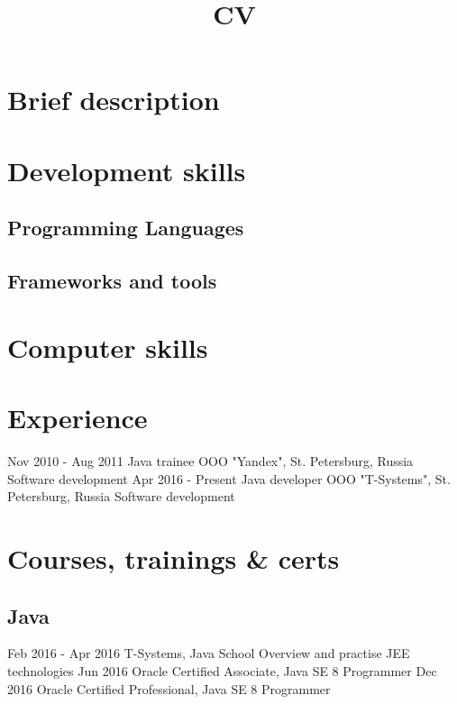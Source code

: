 \documentclass[11pt,a4paper,russian]{moderncv}
\title{CV}
\begin{document}
\maketitle

\section{Brief description}
  
\section{Development skills}

\subsection{Programming Languages}

\subsection{Frameworks and tools}

\section{Computer skills}
  
\section{Experience}
\cventry
    {Nov 2010 - Aug 2011}
    {Java trainee}
    {OOO "Yandex", St. Petersburg, Russia}{}{}
    {Software development}
\cventry
    {Apr 2016 - Present}
    {Java developer}
    {OOO "T-Systems", St. Petersburg, Russia}{}{}
    {Software development} 
  
\section{Courses, trainings \& certs}    
\subsection{Java}
\cvline
    {Feb 2016 - Apr 2016}
    {T-Systems, Java School \newline
    Overview and practise JEE technologies}
\cvline
    {Jun 2016}
    {Oracle Certified Associate, Java SE 8 Programmer}
\cvline
    {Dec 2016}
    {Oracle Certified Professional, Java SE 8 Programmer}
    
\end{document}
